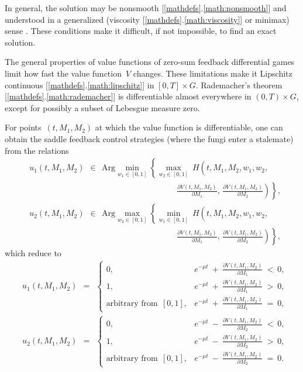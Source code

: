 \documentclass[11pt]{amsart}
\begin{document}
In general, the solution may be 
nonsmooth [\ref{mathdefs}.\ref{math:nonsmooth}] and understood in a generalized (viscosity [\ref{mathdefs}.\ref{math:viscosity}] or minimax) sense \cite{FlemingSoner2006,Subbotin1995}. These conditions make it difficult, if not impossible, to find an exact solution.

The general properties of value functions of zero-sum feedback
differential games \cite{BotkinHoffmannTurova2011} limit how fast the value function~$ V $ changes. These limitations make it Lipschitz continuous [\ref{mathdefs}.\ref{math:lipschitz}] in $ [0, T] \times G $. 
Rademacher's theorem [\ref{mathdefs}.\ref{math:rademacher}]
is differentiable almost everywhere in $ (0, T) \times G $, except
for possibly a 
subset of Lebesgue measure zero. 

For points~$ (t, M_1, M_2) $ at which the value function is differentiable,
one can obtain the saddle feedback control strategies (where the fungi enter a stalemate) from the relations
$$
\begin{aligned}
& u_1(t, M_1, M_2) \:\: \in \:\: \mathrm{Arg} \min_{w_1 \in [0, 1]}
  \left\{ \max_{w_2 \in [0, 1]} \:
H \left( t, M_1, M_2, w_1, w_2, {}^{{}^{{}^{{}^{{}^{}}}}} \right. \right. \\
& \qquad\qquad\qquad\qquad\qquad\qquad\qquad\qquad\qquad
\left. \left. \frac{\partial V(t, M_1, M_2)}{\partial M_1}, \,
  \frac{\partial V(t, M_1, M_2)}{\partial M_2} \right) \right\}, \\
& u_2(t, M_1, M_2) \:\: \in \:\: \mathrm{Arg} \max_{w_2 \in [0, 1]}
  \left\{ \min_{w_1 \in [0, 1]} \:
H \left( t, M_1, M_2, w_1, w_2, {}^{{}^{{}^{{}^{{}^{}}}}} \right. \right. \\
& \qquad\qquad\qquad\qquad\qquad\qquad\qquad\qquad\qquad
\left. \left. \frac{\partial V(t, M_1, M_2)}{\partial M_1}, \,
  \frac{\partial V(t, M_1, M_2)}{\partial M_2} \right) \right\},
\end{aligned}
$$
which reduce to
\begin{equation}
\begin{aligned}
& u_1(t, M_1, M_2) \:\: = \:\: \begin{cases}
0, & e^{-\mu t} \: + \: \frac{\partial V(t, M_1, M_2)}{\partial M_1}
  \: < \: 0, \\
1, & e^{-\mu t} \: + \: \frac{\partial V(t, M_1, M_2)}{\partial M_1}
  \: > \: 0, \\
\mbox{arbitrary from} \:\: [0, 1], & e^{-\mu t} \: + \: \frac{\partial
  V(t, M_1, M_2)}{\partial M_1} \: = \: 0,
\end{cases} \\
& u_2(t, M_1, M_2) \:\: = \:\: \begin{cases}
0, & e^{-\mu t} \: - \: \frac{\partial V(t, M_1, M_2)}{\partial M_2}
  \: < \: 0, \\
1, & e^{-\mu t} \: - \: \frac{\partial V(t, M_1, M_2)}{\partial M_2}
  \: > \: 0, \\
\mbox{arbitrary from} \:\: [0, 1], & e^{-\mu t} \: - \: \frac{\partial V(t,
M_1, M_2)}{\partial M_2} \: = \: 0.
\end{cases}
\end{aligned}  \label{16}
\end{equation}
\end{document}
